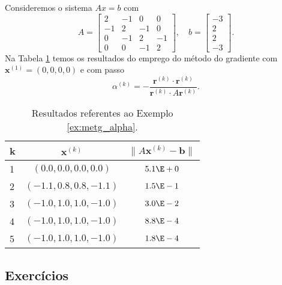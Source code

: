 \begin{ex}\label{ex:metg_alpha}
  Consideremos o sistema $Ax = b$ com
  \begin{equation}
    A =
    \begin{bmatrix}
      2 & -1 & 0 & 0\\
      -1 & 2 & -1 & 0\\
      0 & -1 & 2 & -1 \\
      0 & 0 & -1 & 2
    \end{bmatrix},\quad
    b =
    \begin{bmatrix}
      -3\\
      2\\
      2\\
      -3
    \end{bmatrix}.
  \end{equation}
  Na Tabela \ref{tab:metg_alpha} temos os resultados do emprego do método do gradiente com $\pmb{x}^{(1)} = (0, 0, 0, 0)$ e com passo
  \begin{equation}
    \alpha^{(k)} = - \frac{\pmb{r}^{(k)}\cdot\pmb{r}^{(k)}}{\pmb{r}^{(k)}\cdot A\pmb{r}^{(k)}}.
\end{equation}

  \begin{table}[h!]
    \centering
    \caption{Resultados referentes ao Exemplo \ref{ex:metg_alpha}.}
    \label{tab:metg_alpha}
    \begin{tabular}{l|c|c}
      k & $\pmb{x}^{(k)}$ & $\|A\pmb{x}^{(k)}-\pmb{b}\|$\\\hline
      1 & $(0.0, 0.0, 0.0, 0.0)$ & $5.1\E+0$\\
      2 & $(-1.1, 0.8, 0.8, -1.1)$ & $1.5\E-1$\\
      3 & $(-1.0, 1.0, 1.0, -1.0)$ & $3.0\E-2$\\
      4 & $(-1.0, 1.0, 1.0, -1.0)$ & $8.8\E-4$\\
      5 & $(-1.0, 1.0, 1.0, -1.0)$ & $1.8\E-4$\\\hline
    \end{tabular}
  \end{table}

% 
\end{ex}

\subsection*{Exercícios}

